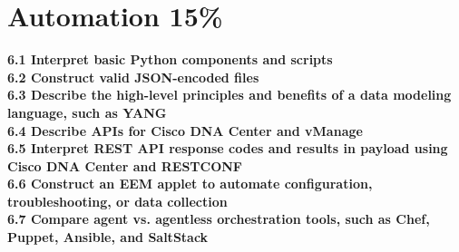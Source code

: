 \documentclass{article}
\begin{document}
\newpage
\section{Automation 15\%}
\noindent\textbf{6.1 Interpret basic Python components and scripts}\\
\noindent\textbf{6.2 Construct valid JSON-encoded files}\\
\noindent\textbf{6.3 Describe the high-level principles and benefits of a data modeling language, such as YANG}\\
\noindent\textbf{6.4 Describe APIs for Cisco DNA Center and vManage}\\
\noindent\textbf{6.5 Interpret REST API response codes and results in payload using Cisco DNA Center and RESTCONF}\\
\noindent\textbf{6.6 Construct an EEM applet to automate configuration, troubleshooting, or data collection}\\



\noindent\textbf{6.7 Compare agent vs. agentless orchestration tools, such as Chef, Puppet, Ansible, and SaltStack}\\
\end{document}

